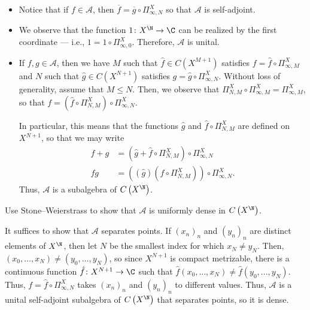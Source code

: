 \documentclass[10pt]{mypackage}
\begin{document}
\begin{solution}\hfill
  \begin{itemize}
    \item Notice that if $f\in \mathcal{A}$, then $ \overline{f} = \overline{g}\circ \Pi_{\infty,N}^{X} $ so that $\mathcal{A}$ is self-adjoint.
    \item We observe that the function $1\colon X^{\N}\to \C$ can be realized by the first coordinate --- i.e., $1 = 1\circ \Pi_{\infty,0}^{X}$. Therefore, $\mathcal{A}$ is unital.
    \item If $f,g\in \mathcal{A}$, then we have $M$ such that $\hat{f}\in C\left( X^{M+1} \right)$ satisfies $f = \hat{f}\circ \Pi_{\infty,M}^{X}$ and $N$ such that $\hat{g}\in C\left( X^{N+1} \right)$ satisfies $g = \hat{g}\circ \Pi^{X}_{\infty,N}$. Without loss of generality, assume that $M\leq N$. Then, we observe that $\Pi_{N,M}^{X}\circ \Pi_{\infty,M}^X = \Pi_{\infty,M}^{X}$, so that $f = \left( \hat{f}\circ \Pi_{N,M}^{X} \right)\circ \Pi_{\infty,N}^{X}$.

      In particular, this means that the functions $\hat{g}$ and $\hat{f}\circ \Pi^{X}_{N,M}$ are defined on $X^{N+1}$, so that we may write
      \begin{align*}
        f+g &= \left( \hat{g} + \hat{f}\circ \Pi^{X}_{N,M}\right)\circ \Pi^{X}_{\infty,N}\\
        fg &= \left( \left( \hat{g} \right)\left( \hat{f}\circ \Pi^{X}_{N,M} \right) \right)\circ \Pi^{X}_{\infty,N}.
      \end{align*}
      Thus, $\mathcal{A}$ is a subalgebra of $C\left( X^{\N} \right)$.
  \end{itemize}
\end{solution}
\begin{problem}[Problem IV.6]
  Use Stone--Weierstrass to show that $ \mathcal{A} $ is uniformly dense in $C\left( X^{\N} \right)$.
\end{problem}
\begin{solution}
  It suffices to show that $\mathcal{A}$ separates points. If $\left( x_n \right)_{n}$ and $\left( y_n \right)_{n}$ are distinct elements of $X^{\N}$, then let $N$ be the smallest index for which $x_N\neq y_N$. Then, $\left( x_0,\dots,x_N \right)\neq \left( y_0,\dots,y_N \right)$, so since $X^{N+1}$ is compact metrizable, there is a continuous function $\hat{f}\colon X^{N+1}\to \C$ such that $\hat{f}\left( x_0,\dots, x_N\right)\neq \hat{f}\left( y_0,\dots,y_N \right)$. Thus, $f = \hat{f}\circ \Pi^{X}_{\infty,N}$ takes $\left( x_n \right)_{n}$ and $\left( y_n \right)_{n}$ to different values. Thus, $\mathcal{A}$ is a unital self-adjoint subalgebra of $C\left( X^{\N} \right)$ that separates points, so it is dense.
\end{solution}
\end{document}
